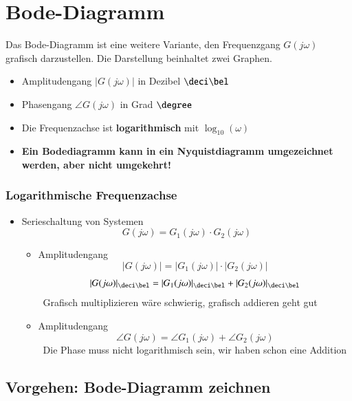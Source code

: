 \section{Bode-Diagramm}

Das Bode-Diagramm ist eine weitere Variante, den Frequenzgang $G(j \omega)$ grafisch darzustellen.
Die Darstellung beinhaltet zwei Graphen.

\begin{itemize}
    \item Amplitudengang $|G(j \omega)|$ in Dezibel $\deci \bel$
    \item Phasengang $\angle G(j \omega)$ in Grad $\degree$
    \item Die Frequenzachse ist \textbf{logarithmisch} mit $\log_{10}(\omega)$
    \item \textbf{Ein Bodediagramm kann in ein Nyquistdiagramm umgezeichnet werden, aber nicht umgekehrt!}
\end{itemize}


\subsubsection{Logarithmische Frequenzachse}

\begin{itemize}
    \item Serieschaltung von Systemen
        $$ G(j \omega) = G_1(j \omega) \cdot G_2(j \omega) $$

    \begin{itemize}
        \item Amplitudengang
            $$ |G(j \omega)| = |G_1(j \omega)| \cdot |G_2(j \omega)| $$
            $$ |G(j \omega)|_{\deci \bel} = |G_1(j \omega)|_{\deci \bel} + |G_2(j \omega)|_{\deci \bel} $$
            \textrightarrow\ Grafisch multiplizieren wäre schwierig, grafisch addieren geht gut
    \end{itemize}

    \begin{itemize}
        \item Amplitudengang
            $$ \angle G(j \omega) = \angle G_1(j \omega) +  \angle G_2(j \omega) $$
            \textrightarrow\ Die Phase muss nicht logarithmisch sein, wir haben schon eine Addition 
    \end{itemize}
\end{itemize}


\subsection{Vorgehen: Bode-Diagramm zeichnen}

